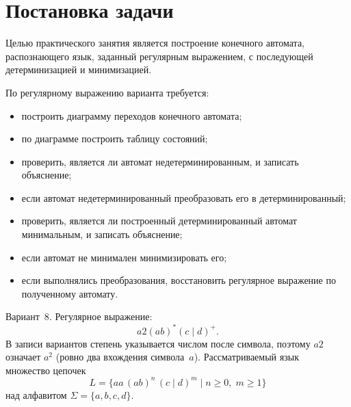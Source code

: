 \section{Постановка задачи}
\label{sec:task}

Целью практического занятия является построение конечного автомата, распознающего язык, заданный регулярным выражением, с последующей детерминизацией и минимизацией.

По регулярному выражению варианта требуется:

\begin{itemize}
	\item построить диаграмму переходов конечного автомата;
	\item по диаграмме построить таблицу состояний;
	\item проверить, является ли автомат недетерминированным, и записать объяснение;
	\item если автомат недетерминированный \mdash{} преобразовать его в детерминированный;
	\item проверить, является ли построенный детерминированный автомат минимальным, и записать объяснение;
	\item если автомат не минимален \mdash{} минимизировать его;
	\item если выполнялись преобразования, восстановить регулярное выражение по полученному автомату.
\end{itemize}

Вариант~8. Регулярное выражение:
\[
a2(ab)^{*}(c\mid d)^{+}.
\]
В записи вариантов степень указывается числом после символа, поэтому $a2$ означает $a^{2}$ (ровно два вхождения символа~$a$). Рассматриваемый язык~\mdash{} множество цепочек
\[
L = \bigl\{ aa\,(ab)^{n}\,(c\mid d)^{m} \mid n \ge 0,\; m \ge 1 \bigr\}
\]
над алфавитом $\Sigma = \{a, b, c, d\}$.
